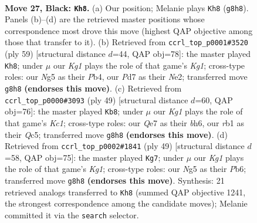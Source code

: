 \documentclass[11pt]{article}
\begin{document}
\clearpage

\begin{figure}[p]\centering
\begin{subfigure}{0.46\textwidth}\centering
\resizebox{\linewidth}{!}{%
\newchessgame
\chessboard[
  setfen={4r1k1/p1ppq3/5pQ1/6n1/1pPP4/P7/2P2P1P/1R4K1 b - - 0 27},
  showmover=false,
  pgfstyle=straightmove, color=movearrow, markmove={g8-h8}
]}
\caption{}
\end{subfigure}\hfill
\begin{subfigure}{0.46\textwidth}\centering
\resizebox{\linewidth}{!}{%
\newchessgame
\chessboard[
  setfen={6k1/p5r1/3pQ3/2qp3P/1p2P3/8/PPP1n3/1K1R4 b - - 4 30},
  showmover=false,
  pgfstyle=straightmove, color=movearrow, markmove={g8-h8}
]}
\caption{}
\end{subfigure}
\\[4pt]
\begin{subfigure}{0.46\textwidth}\centering
\resizebox{\linewidth}{!}{%
\newchessgame
\chessboard[
  setfen={2k5/1p5p/p3Qp1B/2q3P1/3r2n1/8/PP3PP1/R5K1 b - - 0 25},
  showmover=false,
  pgfstyle=straightmove, color=movearrow, markmove={c8-b8}
]}
\caption{}
\end{subfigure}\hfill
\begin{subfigure}{0.46\textwidth}\centering
\resizebox{\linewidth}{!}{%
\newchessgame
\chessboard[
  setfen={3r2k1/p6p/1p2Qp2/8/3q4/8/PP4PP/5R1K b - - 3 25},
  showmover=false,
  pgfstyle=straightmove, color=movearrow, markmove={g8-g7}
]}
\caption{}
\end{subfigure}
\caption{\textbf{Move 27, Black: \texttt{Kh8}.} (a) Our position; Melanie plays \texttt{Kh8} (\texttt{g8h8}). Panels (b)--(d) are the retrieved master positions whose correspondence most drove this move (highest QAP objective among those that transfer to it). (b) Retrieved from \texttt{ccrl\_top\_p0001\#3520} (ply 59) [structural distance $d$=44, QAP obj=78]: the master played \texttt{Kh8}; under $\mu$ our \emph{Kg1} plays the role of that game's \emph{Kg1}; cross-type roles: our \emph{N}g5 as their \emph{P}b4, our \emph{P}d7 as their \emph{N}e2; transferred move \texttt{g8h8} \textbf{(endorses this move)}. (c) Retrieved from \texttt{ccrl\_top\_p0000\#3093} (ply 49) [structural distance $d$=60, QAP obj=76]: the master played \texttt{Kb8}; under $\mu$ our \emph{Kg1} plays the role of that game's \emph{Kc1}; cross-type roles: our \emph{Q}e7 as their \emph{b}h6, our \emph{r}b1 as their \emph{Q}c5; transferred move \texttt{g8h8} \textbf{(endorses this move)}. (d) Retrieved from \texttt{ccrl\_top\_p0002\#1841} (ply 49) [structural distance $d$=58, QAP obj=75]: the master played \texttt{Kg7}; under $\mu$ our \emph{Kg1} plays the role of that game's \emph{Kg1}; cross-type roles: our \emph{N}g5 as their \emph{P}b6; transferred move \texttt{g8h8} \textbf{(endorses this move)}. Synthesis: 21 retrieved analogs transferred to \texttt{Kh8} (summed QAP objective 1241, the strongest correspondence among the candidate moves); Melanie committed it via the \texttt{search} selector.}
\label{fig:thought-m53}
\end{figure}
\end{document}
